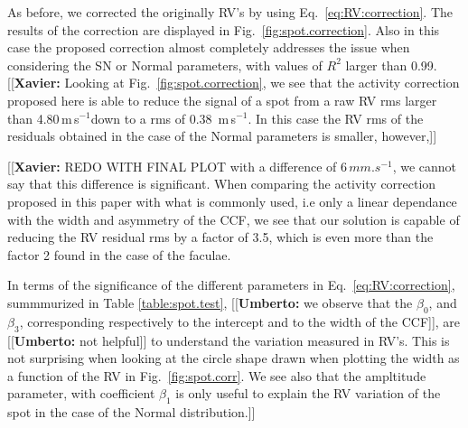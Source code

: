 \documentclass{aa}
\def\ms{\hbox{\,m\,s$^{-1}$}}         %
\newcommand{\xavier}[1]{{\color{blue}[[\textbf{Xavier: }#1]]}}
\newcommand{\umberto}[1]{{\color{green}[[\textbf{Umberto: }#1]]}}
\begin{document}
As before, we corrected the originally RV's by using Eq.~\ref{eq:RV:correction}. The results of the correction are displayed in Fig.~\ref{fig:spot.correction}. Also in this case the proposed correction almost completely addresses the issue when considering the SN or Normal parameters, with values of $R^2$ larger than 0.99. \xavier{Looking at Fig.~\ref{fig:spot.correction}, we see that the activity correction proposed here is able to reduce the signal of a spot from a raw RV rms larger than 4.80\ms down to a rms of 0.38 \ms. In this case the RV rms of the residuals obtained in the case of the Normal parameters is smaller, however,} \xavier{REDO WITH FINAL PLOT with a difference of 6\,$mm.s^{-1}$, we cannot say that this difference is significant. When comparing the activity correction proposed in this paper with what is commonly used, i.e only a linear dependance with the width and asymmetry of the CCF, we see that our solution is capable of reducing the RV residual rms by a factor of 3.5, which is even more than the factor 2 found in the case of the faculae.

In terms of the significance of the different parameters in Eq.~\ref{eq:RV:correction}, summmurized in Table \ref{table:spot.test}, \umberto{we observe that the $\beta_0$, and $\beta_3$, corresponding respectively to the intercept and to the width of the CCF}, are \umberto{not helpful} to understand the variation measured in RV's. This is not surprising when looking at the circle shape drawn when plotting the width as a function of the RV in Fig.~\ref{fig:spot.corr}. We see also that the ampltitude parameter, with coefficient $\beta_1$ is only useful to explain the RV variation of the spot in the case of the Normal distribution.} 
\end{document}
